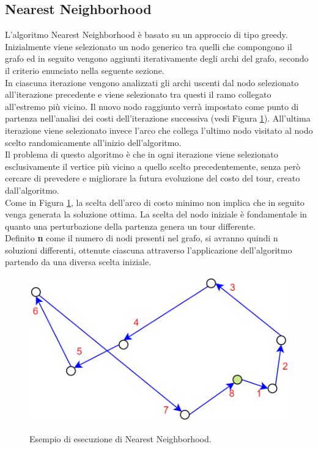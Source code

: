 \subsection{Nearest Neighborhood}
L'algoritmo Nearest Neighborhood è basato su un approccio di tipo greedy. Inizialmente viene selezionato un nodo generico tra quelli che compongono il grafo ed in seguito vengono aggiunti iterativamente degli archi del grafo, secondo il criterio enunciato nella seguente sezione.\\
In ciascuna iterazione vengono analizzati gli archi uscenti dal nodo selezionato all'iterazione precedente e viene selezionato tra questi il ramo collegato all'estremo più vicino. Il nuovo nodo raggiunto verrà impostato come punto di partenza nell'analisi dei costi dell'iterazione successiva (vedi Figura \ref{nearest_neighborhood}).
All'ultima iterazione viene selezionato invece l'arco che collega l'ultimo nodo visitato al nodo scelto randomicamente all'inizio dell'algoritmo.\\
Il problema di questo algoritmo è che in ogni iterazione viene selezionato esclusivamente il vertice più vicino a quello scelto precedentemente, senza però cercare di prevedere e migliorare la futura evoluzione del costo del tour, creato dall'algoritmo.\\
Come in Figura \ref{nearest_neighborhood}, la scelta dell'arco di costo minimo non implica che in seguito venga generata la soluzione ottima. La scelta del nodo iniziale è fondamentale in quanto una perturbazione della partenza genera un tour differente.\\
Definito \textbf{n} come il numero di nodi presenti nel grafo, si avranno quindi n soluzioni differenti, ottenute ciascuna attraverso l'applicazione dell'algoritmo partendo da una diversa scelta iniziale.\\
\begin{figure}[H] 
\begin{center} 
  \includegraphics[scale=0.3]{Images/nearest_neighborhood}\\ 
  \caption{\footnotesize{Esempio di esecuzione di Nearest Neighborhood.}}
  \label{nearest_neighborhood} 
\end{center} 
\end{figure}

